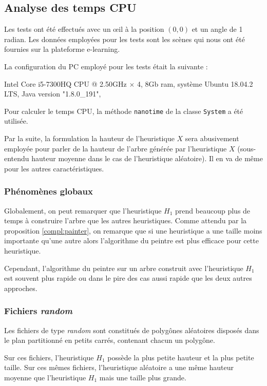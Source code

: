 \subsection{Analyse des temps CPU}
Les tests ont été effectués avec un \oe{}il à la position $(0,0)$ et un
angle de 1 radian. Les données employées pour les tests sont les scènes
qui nous ont été fournies sur la plateforme e-learning.

La configuration du PC employé pour les tests était la suivante :

\begin{center}
  Intel Core i5-7300HQ CPU @ 2.50GHz $\times$ 4,  8Gb ram, système Ubuntu 18.04.2 LTS,
  Java version "1.8.0\_191",
\end{center}
Pour calculer le temps CPU, la méthode \texttt{nanotime} de la classe
\texttt{System} a été utilisée.

Par la suite, la formulation la hauteur de l'heuristique $X$ sera abusivement
employée pour parler de la hauteur de l'arbre générée par l'heuristique $X$
(sous-entendu hauteur moyenne dans le cas de l'heuristique aléatoire).
Il en va de même pour les autres caractéristiques.

\subsubsection*{Phénomènes globaux}
Globalement, on peut remarquer que l'heuristique $H_1$ prend beaucoup plus de
temps à construire l'arbre que les autres heuristiques.
Comme attendu par la proposition \ref{compl:painter}, on remarque
que si une heuristique a une taille moins importante qu'une autre
alors l'algorithme du peintre est plus efficace pour cette heuristique.

Cependant, l'algorithme du peintre sur un arbre construit
avec l'heuristique $H_1$ est souvent plus rapide ou dans le
pire des cas aussi rapide que les deux autres approches.

\subsubsection*{Fichiers \og\emph{random}\fg}
Les fichiers de type \og\emph{random}\fg{} sont constitués de polygônes
aléatoires disposés dans le plan partitionné en petits carrés, contenant
chacun un polygône.

Sur ces fichiers, l'heuristique $H_1$
possède la plus petite hauteur et la plus petite taille.
Sur ces mêmes fichiers, l'heuristique aléatoire a une même hauteur moyenne
que l'heuristique $H_1$ mais une taille plus grande.

